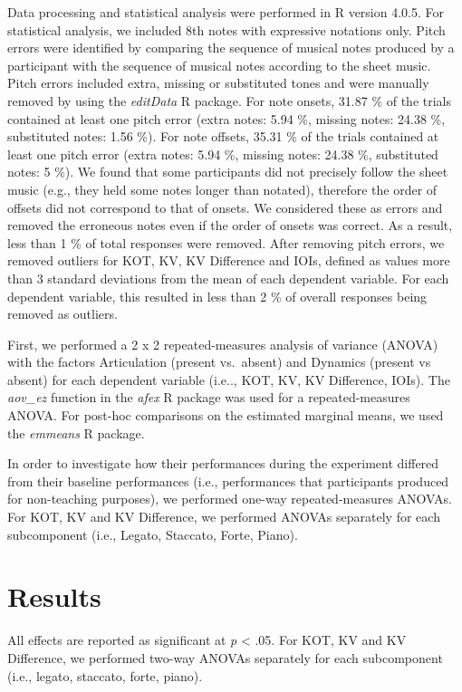 \documentclass[
  man,floatsintext]{apa6}
\begin{document}
Data processing and statistical analysis were performed in R version 4.0.5. For statistical analysis, we included 8th notes with expressive notations only. Pitch errors were identified by comparing the sequence of musical notes produced by a participant with the sequence of musical notes according to the sheet music. Pitch errors included extra, missing or substituted tones and were manually removed by using the \emph{editData} R package. For note onsets, 31.87 \% of the trials contained at least one pitch error (extra notes: 5.94 \%, missing notes: 24.38 \%, substituted notes: 1.56 \%). For note offsets, 35.31 \% of the trials contained at least one pitch error (extra notes: 5.94 \%, missing notes: 24.38 \%, substituted notes: 5 \%). We found that some participants did not precisely follow the sheet music (e.g., they held some notes longer than notated), therefore the order of offsets did not correspond to that of onsets. We considered these as errors and removed the erroneous notes even if the order of onsets was correct. As a result, less than 1 \% of total responses were removed. After removing pitch errors, we removed outliers for KOT, KV, KV Difference and IOIs, defined as values more than 3 standard deviations from the mean of each dependent variable. For each dependent variable, this resulted in less than 2 \% of overall responses being removed as outliers.

First, we performed a 2 x 2 repeated-measures analysis of variance (ANOVA) with the factors Articulation (present vs.~absent) and Dynamics (present vs absent) for each dependent variable (i.e.., KOT, KV, KV Difference, IOIs). The \emph{aov\_ez} function in the \emph{afex} R package was used for a repeated-measures ANOVA. For post-hoc comparisons on the estimated marginal means, we used the \emph{emmeans} R package.

In order to investigate how their performances during the experiment differed from their baseline performances (i.e., performances that participants produced for non-teaching purposes), we performed one-way repeated-measures ANOVAs. For KOT, KV and KV Difference, we performed ANOVAs separately for each subcomponent (i.e., Legato, Staccato, Forte, Piano).

\hypertarget{results}{%
\section{Results}\label{results}}

All effects are reported as significant at \emph{p} \textless{} .05. For KOT, KV and KV Difference, we performed two-way ANOVAs separately for each subcomponent (i.e., legato, staccato, forte, piano).
\end{document}
